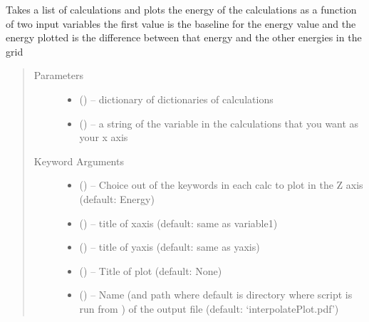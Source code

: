 \documentclass[letterpaper,10pt,english]{sphinxmanual}
\begin{document}
\begin{fulllineitems}
\label{\detokenize{plot:plot.interpolatePlot1D}}
Takes a list of calculations and plots the energy of the calculations as a function of two input variables
the first value is the baseline for the energy value and the energy plotted is the difference between that
energy and the other energies in the grid
\begin{quote}\begin{description}
\item[{Parameters}] \leavevmode\begin{itemize}
\item {} 
 () -- dictionary of dictionaries of calculations

\item {} 
 () -- a string of the variable in the calculations that you want as your x axis

\end{itemize}

\item[{Keyword Arguments}] \leavevmode\begin{itemize}
\item {} 
 () -- Choice out of the keywords in each calc to plot in the Z axis (default: Energy)

\item {} 
 () -- title of xaxis (default: same as variable1)

\item {} 
 () -- title of yaxis (default: same as yaxis)

\item {} 
 () -- Title of plot (default: None)

\item {} 
 () -- Name (and path where default is directory where script is run from ) of the
output file (default: `interpolatePlot.pdf')


\end{itemize}
\end{description}
\end{quote}
\end{fulllineitems}
\end{document}
